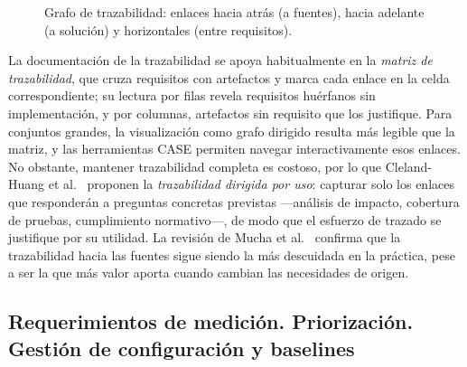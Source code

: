 \documentclass[11pt,a4paper,oneside]{report}
\begin{document}
	\begin{figure}[htbp]
		\centering
		\caption{Grafo de trazabilidad: enlaces hacia atr\'as (a fuentes), hacia adelante (a soluci\'on) y horizontales (entre requisitos).}
		\label{fig:trazabilidad}
	\end{figure}
	
	La documentaci\'on de la trazabilidad se apoya habitualmente en la \textit{matriz de trazabilidad}, que cruza requisitos con artefactos y marca cada enlace en la celda correspondiente; su lectura por filas revela requisitos hu\'erfanos sin implementaci\'on, y por columnas, artefactos sin requisito que los justifique. Para conjuntos grandes, la visualizaci\'on como grafo dirigido resulta m\'as legible que la matriz, y las herramientas CASE permiten navegar interactivamente esos enlaces. No obstante, mantener trazabilidad completa es costoso, por lo que Cleland-Huang et al.~\citep{clelandhuang_2014} proponen la \textit{trazabilidad dirigida por uso}: capturar solo los enlaces que responder\'an a preguntas concretas previstas ---an\'alisis de impacto, cobertura de pruebas, cumplimiento normativo---, de modo que el esfuerzo de trazado se justifique por su utilidad. La revisi\'on de Mucha et al.~\citep{mucha_prereq_trace_2024} confirma que la trazabilidad hacia las fuentes sigue siendo la m\'as descuidada en la pr\'actica, pese a ser la que m\'as valor aporta cuando cambian las necesidades de origen.
	
	\subsection{Requerimientos de medici\'on. Priorizaci\'on. Gesti\'on de configuraci\'on y baselines}
	
\end{document}
